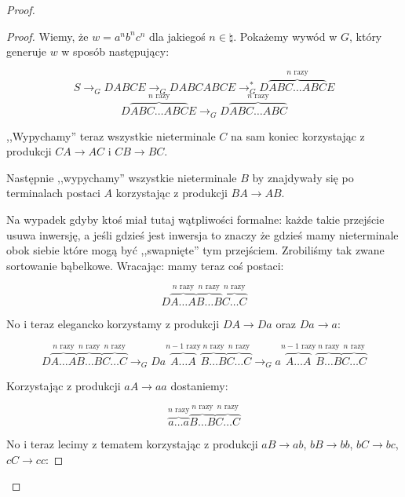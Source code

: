 \begin{proof}
\begin{proof}
        Wiemy, że \(w = a^nb^nc^n\) dla jakiegoś \(n \in \natural\). Pokażemy wywód w \(G\), który generuje \(w\) w sposób następujący:
        
        \[ 
            S \rightarrow_G DABCE \rightarrow_G DABCABCE \rightarrow^*_G D \overbrace{ABC \dots ABC}^{\text{\(n\) razy}}E
        \]
        \[
            D \overbrace{ABC \dots ABC}^{\text{\(n\) razy}}E \rightarrow_G D \overbrace{ABC \dots ABC}^{\text{\(n\) razy}}
        \]
        
        ,,Wypychamy'' teraz wszystkie nieterminale \(C\) na sam koniec korzystając z produkcji \(CA \rightarrow AC\) i \(CB \rightarrow BC\).
        
        Następnie ,,wypychamy'' wszystkie nieterminale \(B\) by znajdywały się po terminalach postaci \(A\) korzystając z produkcji \(BA \rightarrow AB\). 
        
        Na wypadek gdyby ktoś miał tutaj wątpliwości formalne: każde takie przejście usuwa inwersję, a jeśli gdzieś jest inwersja to znaczy że gdzieś mamy nieterminale obok siebie które mogą być ,,swapnięte'' tym przejściem. Zrobiliśmy tak zwane sortowanie bąbelkowe. 
        Wracając: mamy teraz coś postaci: 
        
        \[
            D \overbrace{A \dots A}^{\text{\(n\) razy}} \overbrace{B \dots B}^{\text{\(n\) razy}}
            \overbrace{C \dots C}^{\text{\(n\) razy}}
        \]
        
        No i teraz elegancko korzystamy z produkcji \( DA \rightarrow Da \) oraz \(Da \rightarrow a\):
        
        \[
        D \overbrace{A \dots A}^{\text{\(n\) razy}} \overbrace{B \dots B}^{\text{\(n\) razy}}
        \overbrace{C \dots C}^{\text{\(n\) razy}} \rightarrow_G Da\overbrace{A \dots A}^{\text{\(n-1\) razy}} \overbrace{B \dots B}^{\text{\(n\) razy}}
        \overbrace{C \dots C}^{\text{\(n\) razy}}
        \rightarrow_G a\overbrace{A \dots A}^{\text{\(n-1\) razy}} \overbrace{B \dots B}^{\text{\(n\) razy}}
        \overbrace{C \dots C}^{\text{\(n\) razy}}
        \]
        
        Korzystając z produkcji \(aA \rightarrow aa\) dostaniemy:
        
        \[ 
            \overbrace{a \dots a}^{\text{\(n\) razy}} \overbrace{B \dots B}^{\text{\(n\) razy}}
            \overbrace{C \dots C}^{\text{\(n\) razy}}
        \]
        
        No i teraz lecimy z tematem korzystając z produkcji \(aB \rightarrow ab \), \(bB \rightarrow bb\), \(bC \rightarrow bc\), \( cC \rightarrow cc\):
        

\end{proof}
\end{proof}
